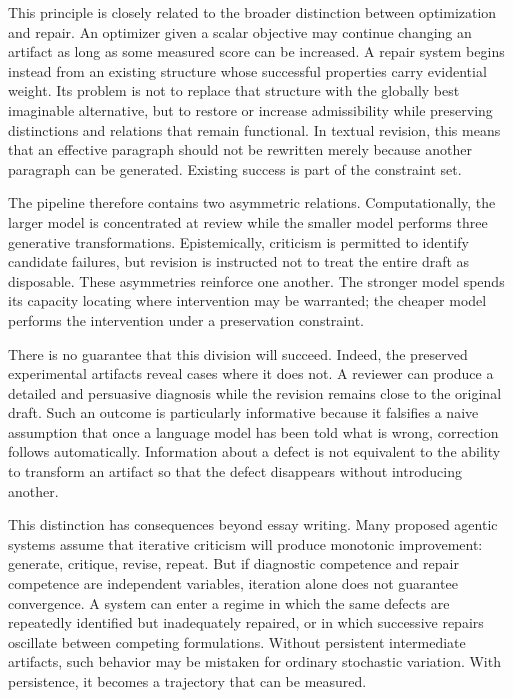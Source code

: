 \documentclass[11pt]{article}
\begin{document}
This principle is closely related to the broader distinction between optimization and repair. An optimizer given a scalar objective may continue changing an artifact as long as some measured score can be increased. A repair system begins instead from an existing structure whose successful properties carry evidential weight. Its problem is not to replace that structure with the globally best imaginable alternative, but to restore or increase admissibility while preserving distinctions and relations that remain functional. In textual revision, this means that an effective paragraph should not be rewritten merely because another paragraph can be generated. Existing success is part of the constraint set.

The pipeline therefore contains two asymmetric relations. Computationally, the larger model is concentrated at review while the smaller model performs three generative transformations. Epistemically, criticism is permitted to identify candidate failures, but revision is instructed not to treat the entire draft as disposable. These asymmetries reinforce one another. The stronger model spends its capacity locating where intervention may be warranted; the cheaper model performs the intervention under a preservation constraint.

There is no guarantee that this division will succeed. Indeed, the preserved experimental artifacts reveal cases where it does not. A reviewer can produce a detailed and persuasive diagnosis while the revision remains close to the original draft. Such an outcome is particularly informative because it falsifies a naive assumption that once a language model has been told what is wrong, correction follows automatically. Information about a defect is not equivalent to the ability to transform an artifact so that the defect disappears without introducing another.

This distinction has consequences beyond essay writing. Many proposed agentic systems assume that iterative criticism will produce monotonic improvement: generate, critique, revise, repeat. But if diagnostic competence and repair competence are independent variables, iteration alone does not guarantee convergence. A system can enter a regime in which the same defects are repeatedly identified but inadequately repaired, or in which successive repairs oscillate between competing formulations. Without persistent intermediate artifacts, such behavior may be mistaken for ordinary stochastic variation. With persistence, it becomes a trajectory that can be measured.
\end{document}
